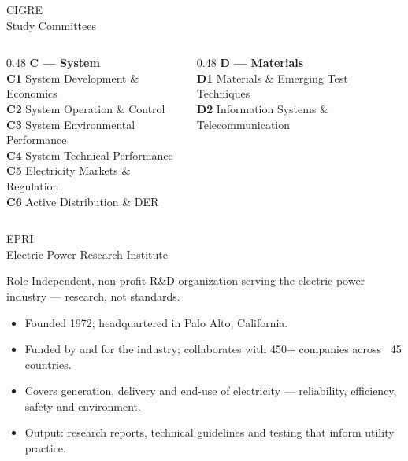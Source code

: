 \begin{frame}{CIGRE\\Study Committees}
  \vspace{0.6em}
  \begin{columns}[T,onlytextwidth]
    \begin{column}{0.48\textwidth}
      {\color{atAccent}\textbf{C — System}}\\[0.35em]
      \footnotesize
      \textbf{C1} System Development \& Economics\\[0.25em]
      \textbf{C2} System Operation \& Control\\[0.25em]
      \textbf{C3} System Environmental Performance\\[0.25em]
      \textbf{C4} System Technical Performance\\[0.25em]
      \textbf{C5} Electricity Markets \& Regulation\\[0.25em]
      \textbf{C6} Active Distribution \& DER
    \end{column}
    \begin{column}{0.48\textwidth}
      {\color{atAccent}\textbf{D — Materials}}\\[0.35em]
      \footnotesize
      \textbf{D1} Materials \& Emerging Test Techniques\\[0.25em]
      \textbf{D2} Information Systems \& Telecommunication
    \end{column}
  \end{columns}
  \vspace{0.8em}
\end{frame}


\begin{frame}{EPRI\\Electric Power Research Institute}
  \begin{block}{Role}
    Independent, non-profit R\&D organization serving the electric power
    industry — research, not standards.
  \end{block}
  \vspace{0.3em}
  \begin{itemize}
    \setlength{\itemsep}{0.4em}
    \item Founded 1972; headquartered in Palo Alto, California.
    \item Funded by and for the industry; collaborates with 450+ companies across ~45 countries.
    \item Covers generation, delivery and end-use of electricity — reliability, efficiency, safety and environment.
    \item Output: research reports, technical guidelines and testing that inform utility practice.
  \end{itemize}
\end{frame}


